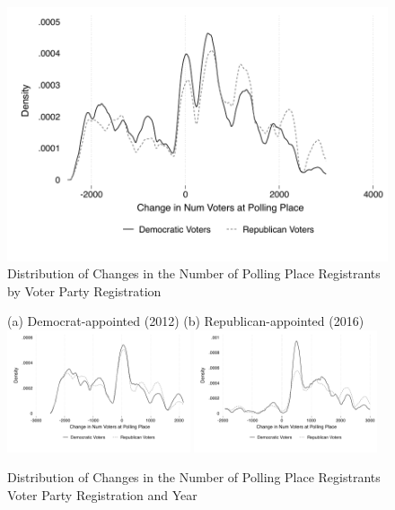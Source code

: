 \documentclass[12pt]{article}
\begin{document}
\begin{figure}[h!]
	\begin{center}
	\caption{Distribution of Changes in the Number of Polling Place Registrants by Voter Party Registration} \label{KDPPbyParty}
		\small
		\smallskip
		\includegraphics{../../50_results_full/kdensity_change_pp_registrants.pdf}
		\end{center}
\end{figure} \normalsize


\begin{figure}[h!]
	\begin{center}
	\caption{Distribution of Changes in the Number of Polling Place Registrants Voter Party Registration and Year} \label{KDPPbyPartybyYear}
		\small \vspace*{.08in}
    (a) Democrat-appointed (2012) \hspace*{1.2in} (b) Republican-appointed (2016) \\
		\smallskip
		\includegraphics[width=0.48\textwidth]{../../50_results_full/kdensity_change_pp_registrants_2012.pdf}		\includegraphics[width=0.48\textwidth]{../../50_results_full/kdensity_change_pp_registrants_2016.pdf}
		\end{center}
\end{figure} \normalsize
\end{document}
